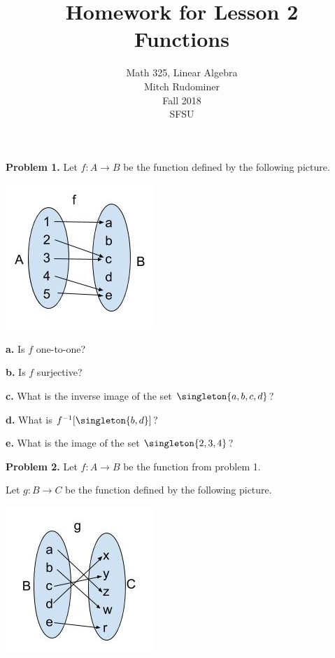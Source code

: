 \documentclass[oneside,12pt]{amsart}
\begin{document}
\title{Homework for Lesson 2 \\ Functions}
\author{Math 325, Linear Algebra \\ Mitch Rudominer \\ Fall 2018 \\ SFSU }
\date{}

\maketitle


\textbf{Problem 1.} Let $f:A\to B$ be the function defined by the following
picture.

\includegraphics[scale=0.25]{hw_function1}

\textbf{a.} Is $f$ one-to-one?

\smallskip

\textbf{b.} Is $f$ surjective?

\smallskip

\textbf{c.} What is the inverse image of the set $\singleton{a,b,c,d}$?

\medskip

\textbf{d.} What is $f^{-1}[\singleton{b, d}]$?

\medskip

\textbf{e.} What is the image of the set $\singleton{2,3,4}$?

\bigskip

\textbf{Problem 2.} Let $f:A\to B$ be the function from problem 1.

Let $g:B\to C$ be the function defined by the following
picture.

\includegraphics[scale=0.25]{hw_function2}
\end{document}
